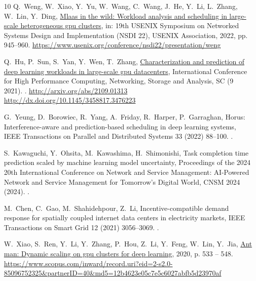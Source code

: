 \documentclass[preprint,12pt]{elsarticle}
\begin{document}
\begin{thebibliography}{10}
Q.~Weng, W.~Xiao, Y.~Yu, W.~Wang, C.~Wang, J.~He, Y.~Li, L.~Zhang, W.~Lin,
  Y.~Ding,
  \href{https://www.usenix.org/conference/nsdi22/presentation/weng}{Mlaas in
  the wild: Workload analysis and scheduling in large-scale heterogeneous gpu
  clusters}, in: 19th USENIX Symposium on Networked Systems Design and
  Implementation (NSDI 22), USENIX Association, 2022, pp. 945--960.
\newline\urlprefix\url{https://www.usenix.org/conference/nsdi22/presentation/weng}

Q.~Hu, P.~Sun, S.~Yan, Y.~Wen, T.~Zhang, \href{http://arxiv.org/abs/2109.01313
  http://dx.doi.org/10.1145/3458817.3476223}{Characterization and prediction of
  deep learning workloads in large-scale gpu datacenters}, International
  Conference for High Performance Computing, Networking, Storage and Analysis,
  SC (9 2021).
\newblock \href {https://doi.org/10.1145/3458817.3476223}
  {}.
\newline\urlprefix\url{http://arxiv.org/abs/2109.01313
  http://dx.doi.org/10.1145/3458817.3476223}

G.~Yeung, D.~Borowiec, R.~Yang, A.~Friday, R.~Harper, P.~Garraghan, Horus:
  Interference-aware and prediction-based scheduling in deep learning systems,
  IEEE Transactions on Parallel and Distributed Systems 33 (2022) 88--100.
\newblock \href {https://doi.org/10.1109/TPDS.2021.3079202}
  {}.

S.~Kawaguchi, Y.~Ohsita, M.~Kawashima, H.~Shimonishi, Task completion time
  prediction scaled by machine learning model uncertainty, Proceedings of the
  2024 20th International Conference on Network and Service Management:
  AI-Powered Network and Service Management for Tomorrow's Digital World, CNSM
  2024 (2024).
\newblock \href {https://doi.org/10.23919/CNSM62983.2024.10814629}
  {}.

M.~Chen, C.~Gao, M.~Shahidehpour, Z.~Li, Incentive-compatible demand response
  for spatially coupled internet data centers in electricity markets, IEEE
  Transactions on Smart Grid 12 (2021) 3056--3069.
\newblock \href {https://doi.org/10.1109/TSG.2021.3053433}
  {}.

W.~Xiao, S.~Ren, Y.~Li, Y.~Zhang, P.~Hou, Z.~Li, Y.~Feng, W.~Lin, Y.~Jia,
  \href{https://www.scopus.com/inward/record.uri?eid=2-s2.0-85096752325&partnerID=40&md5=12b4623e05c7e5c6027abfb5d23970af}{Ant
  man: Dynamic scaling on gpu clusters for deep learning}, 2020, p. 533 –
  548.
\newline\urlprefix\url{https://www.scopus.com/inward/record.uri?eid=2-s2.0-85096752325&partnerID=40&md5=12b4623e05c7e5c6027abfb5d23970af}


\end{thebibliography}
\end{document}

